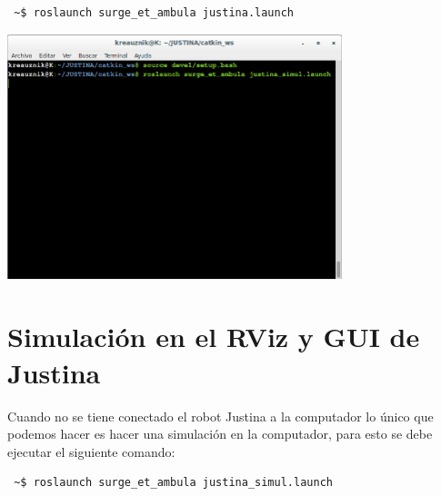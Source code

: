 \documentclass[user_manual.tex]{subfiles}
\begin{document}
\begin{verbatim}
 ~$ roslaunch surge_et_ambula justina.launch
\end{verbatim}

 \begin{center}
\includegraphics[width=0.73\textwidth]{Figures/PP/pp6.png}
\end{center}
\section{Simulación en el RViz y GUI de Justina}
Cuando no se tiene conectado el robot Justina a la computador lo único que podemos hacer
es hacer una simulación en la computador, para esto se debe ejecutar el siguiente comando:\\
\begin{verbatim}
 ~$ roslaunch surge_et_ambula justina_simul.launch
\end{verbatim}
\end{document}
